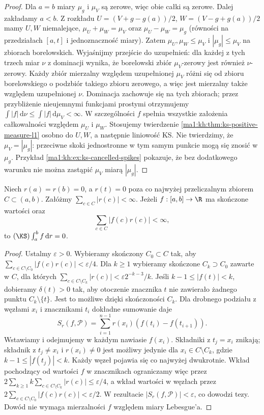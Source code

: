 \begin{proof}
Dla $a=b$ miary $\mu_g$ i $\mu_V$ są zerowe, więc obie całki są zerowe. Dalej zakładamy $a<b$. Z rozkładu $U=(V+g-g(a))/2$, $W=(V-g+g(a))/2$ mamy $U,W$ niemalejące, $\mu_U+\mu_W=\mu_V$ oraz $\mu_U-\mu_W=\mu_g$ (równości na przedziałach $[a,t]$ i jednoznaczność miary). Zatem $\mu_U,\mu_W\le\mu_V$ i $|\mu_g|\le\mu_V$ na zbiorach borelowskich. Wyjaśnijmy przejście do uzupełnień: dla każdej z tych trzech miar $\nu$ z dominacji wynika, że borelowski zbiór $\mu_V$-zerowy jest również $\nu$-zerowy. Każdy zbiór mierzalny względem uzupełnionej $\mu_V$ różni się od zbioru borelowskiego o podzbiór takiego zbioru zerowego, a więc jest mierzalny także względem uzupełnionej $\nu$. Dominacja zachowuje się na tych zbiorach; przez przybliżenie nieujemnymi funkcjami prostymi otrzymujemy $\int|f|\,\mathrm d\nu\le\int|f|\,\mathrm d\mu_V<\infty$. W szczególności $f$ spełnia wszystkie założenia całkowalności względem $\mu_U$ i $\mu_W$. Stosujemy twierdzenie \ref{ma1:kh:thm:ks-positive-measure-l1} osobno do $U,W$, a następnie liniowość KS. Nie twierdzimy, że $\mu_V=|\mu_g|$: przeciwne skoki jednostronne w tym samym punkcie mogą się znosić w $\mu_g$. Przykład \ref{ma1:kh:ex:ks-cancelled-spikes} pokazuje, że bez dodatkowego warunku nie można zastąpić $\mu_V$ miarą $|\mu_g|$.
\end{proof}
\begin{lemat}\label{ma1:kh:lem:ks-point-spikes}
Niech $r(a)=r(b)=0$, a $r(t)=0$ poza co najwyżej przeliczalnym zbiorem $C\subset(a,b)$. Załóżmy $\sum_{c\in C}|r(c)|<\infty$. Jeżeli $f:[a,b]\to\R$ ma skończone wartości oraz
\[
 \sum_{c\in C}|f(c)r(c)|<\infty,
\]
to $(\KS)\int_a^b f\,\mathrm dr=0$.
\end{lemat}
\begin{proof}
Ustalmy $\varepsilon>0$. Wybieramy skończony $C_0\subset C$ tak, aby $\sum_{c\in C\setminus C_0}|f(c)r(c)|<\varepsilon/4$. Dla $k\ge1$ wybieramy skończone $C_k\supset C_0$ zawarte w $C$, dla których
$\sum_{c\in C\setminus C_k}|r(c)|<\varepsilon 2^{-k-3}/k$.
Jeśli $k-1\le |f(t)|<k$, dobieramy $\delta(t)>0$ tak, aby otoczenie znacznika $t$ nie zawierało żadnego punktu $C_k\setminus\{t\}$. Jest to możliwe dzięki skończoności $C_k$.
Dla drobnego podziału z węzłami $x_i$ i znacznikami $t_i$ dokładne sumowanie daje
\[
 S_r(f,\mathcal P)=\sum_{i=1}^{n-1}r(x_i)(f(t_i)-f(t_{i+1})).
\]
Wstawiamy i odejmujemy w każdym nawiasie $f(x_i)$. Składniki z $t_j=x_i$ znikają; składnik z $t_j\ne x_i$ i $r(x_i)\ne0$ jest możliwy jedynie dla $x_i\in C\setminus C_k$, gdzie $k-1\le |f(t_j)|<k$. Każdy węzeł pojawia się co najwyżej dwukrotnie. Wkład pochodzący od wartości $f$ w znacznikach ograniczamy więc przez
$2\sum_{k\ge1}k\sum_{c\in C\setminus C_k}|r(c)|\le\varepsilon/4$,
a wkład wartości w węzłach przez
$2\sum_{c\in C\setminus C_0}|f(c)r(c)|<\varepsilon/2$.
W rezultacie $|S_r(f,\mathcal P)|<\varepsilon$, co dowodzi tezy. Dowód nie wymaga mierzalności $f$ względem miary Lebesgue'a.
\end{proof}
